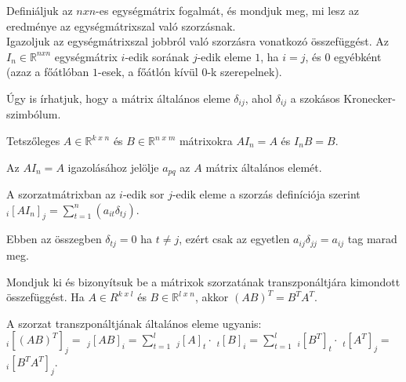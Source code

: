 \begin{frame}
  \begin{tcolorbox}[title={7. (4p)}]
      Definiáljuk az $n x n$-es egységmátrix fogalmát, és mondjuk meg, mi lesz az eredménye az egységmátrixszal való szorzásnak.\\
      
      Igazoljuk az egységmátrixszal jobbról való szorzásra vonatkozó összefüggést. 
  \tcblower
    Az $I_n \in \mathbb{R}^{n x n}$ egységmátrix $i$-edik sorának $j$-edik eleme $1$, ha $i = j$, és $0$ egyébként (azaz a főátlóban $1$-esek, a főátlón kívül $0$-k szerepelnek).\\
    \mmedskip
    
    Úgy is írhatjuk, hogy a mátrix általános eleme ${\delta}_{ij}$, ahol ${\delta}_{ij}$ a szokásos Kronecker-szimbólum.\\
    \mmedskip
        
    Tetszőleges $A \in \mathbb{R}^{k \; x \; n}$ és $B \in \mathbb{R}^{n \; x \; m}$ mátrixokra $AI_n = A$ és $I_nB = B$.\\
    \mmedskip
    
    Az $AI_n = A$ igazolásához jelölje $a_{pq}$ az $A$ mátrix általános elemét.\\
    \mmedskip
    
    A szorzatmátrixban az $i$-edik sor $j$-edik eleme a szorzás definíciója szerint $_{i} [AI_n]_j = \sum_{t = 1}^n (a_{it}{\delta}_{tj})$.\\
    \mmedskip
    
    Ebben az összegben ${\delta}_{tj} = 0$ ha $t \neq j$, ezért csak az egyetlen $a_{ij}{\delta}_{jj} = a_{ij}$ tag marad meg.
  \end{tcolorbox}
\end{frame}


\begin{frame}
  \begin{tcolorbox}[title={8. (4p)}]
       Mondjuk ki és bizonyítsuk be a mátrixok szorzatának transzponáltjára kimondott összefüggést. 
  \tcblower
    Ha $A \in R^{k \; x \; l}$ és $B \in \mathbb{R}^{l \; x \; n}$, akkor $(AB)^T = B^TA^T$.\\
    \mmedskip
    
    A szorzat transzponáltjának általános eleme ugyanis:\\
    \mmedskip
     $_{i} [(AB)^T]_j =$ $_{j} [AB]_i = \sum_{t = 1}^l $ $_{j} [A]_t \cdot $ $_{t} [B]_i = \sum_{t = 1}^l $ $_{i} [B^T]_t  \cdot  $ $_{t} [A^T]_j = $ $_{i} [B^TA^T]_j$.
  \end{tcolorbox}
\end{frame}

